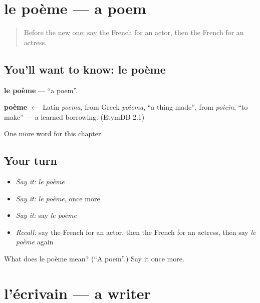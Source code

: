 \section[le poème]{le poème — a poem}

\label{lesson:FR-C249-poeme}



\begin{quote}
Before the new one: say the French for an actor, then the French for an actress.
\end{quote}

\subsection*{You'll want to know: le poème}
\textbf{le poème} — \textquotedblleft{}a poem\textquotedblright{}.

\begin{cousinweb}
\textbf{poème} $\leftarrow$ Latin \emph{poema}, from Greek \emph{poiema}, \textquotedblleft{}a thing made\textquotedblright{}, from \emph{poiein}, \textquotedblleft{}to make\textquotedblright{} — a learned borrowing. (EtymDB 2.1)
\end{cousinweb}

\begin{grammarlens}[title={What you've built}]
One more word for this chapter.
\end{grammarlens}

\subsection*{Your turn}
\begin{itemize}
\raggedright
  \item \emph{Say it:} \emph{le poème}
  \item \emph{Say it:} \emph{le poème}, once more
  \item \emph{Say it:} say \emph{le poème}
  \item \emph{Recall:} say the French for an actor, then the French for an actress, then say \emph{le poème} again
\end{itemize}

\begin{tcolorbox}[breakable,colback=teal!4,colframe=teal!35!black,title={Before you move on}]
What does le poème mean? (\textquotedblleft{}A poem\textquotedblright{}.) Say it once more.
\end{tcolorbox}
\section[l'écrivain]{l'écrivain — a writer}

